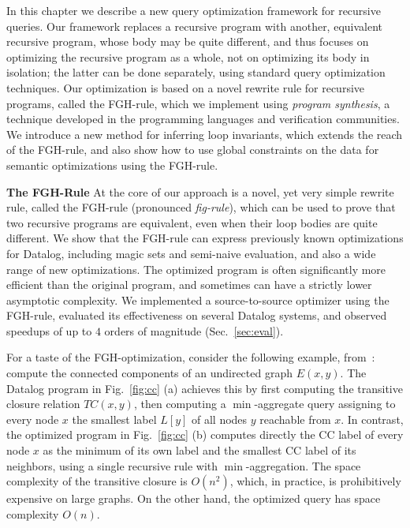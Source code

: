 In this chapter we describe a new query optimization framework for
recursive queries.  Our framework replaces a recursive program with
another, equivalent recursive program, whose body may be quite
different, and thus focuses on optimizing the recursive program as a
whole, not on optimizing its body in isolation; the latter can be done
separately, using standard query optimization techniques.  Our
optimization is based on a novel rewrite rule for recursive programs,
called the FGH-rule, which we implement using {\em program synthesis},
a technique developed in the programming languages and verification
communities. We introduce a new method for inferring loop invariants,
which extends the reach of the FGH-rule, and also show how to use
global constraints on the data for semantic optimizations using the
FGH-rule.  


{\bf The FGH-Rule} At the core of our approach is a novel, yet very
simple rewrite rule, called the FGH-rule (pronounced {\em fig-rule}),
which can be used to prove that two recursive programs are equivalent,
even when their loop bodies are quite different.  We show that the
FGH-rule can express previously known optimizations for Datalog,
including magic sets and semi-naive evaluation, and also a wide range
of new optimizations.  The optimized program is often significantly
more efficient than the original program, and sometimes can have a
strictly lower asymptotic complexity.  We implemented a
source-to-source optimizer using the FGH-rule, evaluated its
effectiveness on several Datalog systems, and observed speedups of up
to $4$ orders of magnitude (Sec.~\ref{sec:eval}).

For a taste of the FGH-optimization, consider the following example,
from~\cite{DBLP:journals/tplp/ZanioloYDSCI17,DBLP:conf/amw/ZanioloYIDSC18}:
compute the connected components of an undirected graph $E(x,y)$.  The
Datalog program in Fig.~\ref{fig:cc} (a) achieves this by first
computing the transitive closure relation $TC(x,y)$, then computing a
$\min$-aggregate query
assigning to every node $x$ the smallest label $L[y]$ of all nodes $y$ reachable from $x$.
In contrast, the optimized program in Fig.~\ref{fig:cc} (b)
computes directly the CC label of every node $x$ as the  minimum of its own label
and the smallest CC label of its neighbors,
using a single recursive rule with
$\min$-aggregation.
The space complexity of the transitive closure is
$O(n^2)$, which, in practice, is prohibitively expensive on large graphs.
On the other hand, the optimized query has space complexity $O(n)$.

